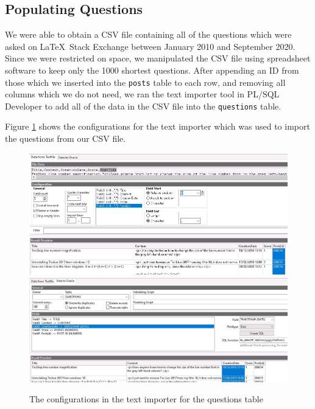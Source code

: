 
\subsection{Populating Questions}

We were able to obtain a CSV file containing all of the questions which were asked on \LaTeX\ Stack Exchange between January 2010 and September 2020. Since we were restricted on space, we manipulated the CSV file using spreadsheet software to keep only the 1000 shortest questions. After appending an ID from those which we inserted into the \verb`posts` table to each row, and removing all columns which we do not need, we ran the text importer tool in PL/SQL Developer to add all of the data in the CSV file into the \verb`questions` table.

Figure \ref{questions-text-import} shows the configurations for the text importer which was used to import the questions from our CSV file.

\begin{figure}[hbp]
	\centering
	\includegraphics[width=\linewidth]{images/questions_text_import_1.jpeg}
	\vspace{2em}
	\includegraphics[width=\linewidth]{images/questions_text_import_2.jpeg}
	\caption{The configurations in the text importer for the questions table}
	\label{questions-text-import}
\end{figure}


